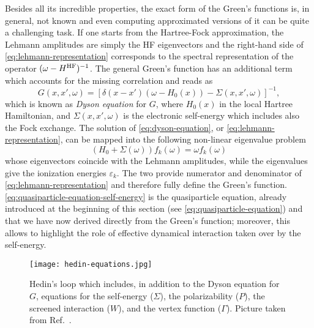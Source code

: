 Besides all its incredible properties, the exact form of the Green's functions is, in general, not known and even computing approximated versions of it can be quite a challenging task. If one starts from the Hartree-Fock approximation, the Lehmann amplitudes are simply the HF eigenvectors and the right-hand side of \cref{eq:lehmann-representation} corresponds to the spectral representation of the operator $(\omega-H^{\rm HF})^{-1}$. The general Green's function has an additional term which accounts for the missing correlation and reads as
%
\begin{equation}
    G(x,x',\omega) = \left[ \delta(x-x') (\omega - H_0(x)) - \Sigma(x,x',\omega) \right]^{-1} ,
    \label{eq:dyson-equation}
\end{equation}
%
which is known as \emph{Dyson equation} for $G$, where $H_0(x)$ in the local Hartree Hamiltonian, and $\Sigma(x,x',\omega)$ is the electronic self-energy which includes also the Fock exchange. The solution of \cref{eq:dyson-equation}, or \cref{eq:lehmann-representation}, can be mapped into the following non-linear eigenvalue problem
%
\begin{equation}
    \left( H_0 + \Sigma(\omega) \right) f_k(\omega) = \omega f_k(\omega)
    \label{eq:quasiparticle-equation-self-energy}
\end{equation}
%
whose eigenvectors coincide with the Lehmann amplitudes, while the eigenvalues give the ionization energies $\varepsilon_k$. The two provide numerator and denominator of \cref{eq:lehmann-representation} and therefore fully define the Green's function. \cref{eq:quasiparticle-equation-self-energy} is the quasiparticle equation, already introduced at the beginning of this section (see \cref{eq:quasiparticle-equation}) and that we have now derived directly from the Green's function; moreover, this allows to highlight the role of effective dynamical interaction taken over by the self-energy.

\begin{figure}
    \centering
    \texttt{[image: hedin-equations.jpg]}
    \caption[Hedin's set of equations.]{Hedin's loop which includes, in addition to the Dyson equation for $G$, equations for the self-energy ($\Sigma$), the polarizability ($P$), the screened interaction ($W$), and the vertex function ($\Gamma$). Picture taken from Ref.~\cite{leng_gw_2016}.}
    \label{fig:hedin}
\end{figure}

